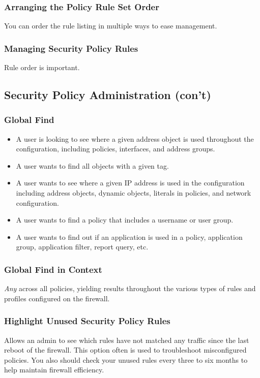 \subsubsection{Arranging the Policy Rule Set Order}
You can order the rule listing in multiple ways to ease management.

\subsubsection{Managing Security Policy Rules}
Rule order is important.

\subsection{Security Policy Administration (con't)}
\subsubsection{Global Find}
    \begin{itemize}
        \item A user is looking to see where a given address object is used throughout the configuration, including policies, interfaces, and address groups.
        \item A user wants to find all objects with a given tag.
        \item A user wants to see where a given IP address is used in the configuration including address objects, dynamic objects, literals in policies, and network configuration.
        \item A user wants to find a policy that includes a username or user group.
        \item A user wants to find out if an application is used in a policy, application group, application filter, report query, etc.
    \end{itemize}
\subsubsection{Global Find in Context}
\textit{Any} across all policies, yielding results throughout the various types of rules and profiles configured on the firewall.

\subsubsection{Highlight Unused Security Policy Rules}
Allows an admin to see which rules have not matched any traffic since the last reboot of the firewall. This option often is used to troubleshoot misconfigured policies. You also should check your unused rules every three to six months to help maintain firewall efficiency.

